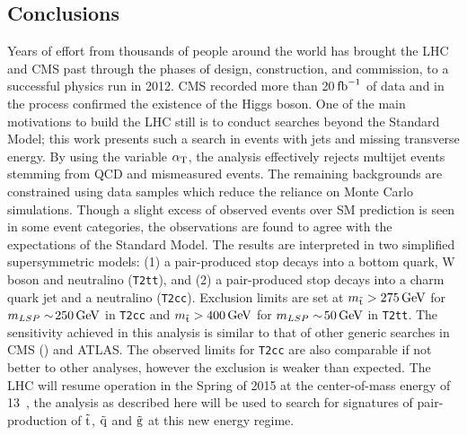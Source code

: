 \FloatBarrier
\subsection{Conclusions}


Years of effort from thousands of people around the world
has brought the LHC and CMS past through the phases of design, construction,
and commission, to a successful physics run in 2012. CMS recorded more than 
20$\mbox{\ensuremath{\,\text{fb}^\text{$-$1}}}$ of data and in the process confirmed the existence of the Higgs boson. 
One of the main motivations to build the LHC still is to conduct
searches beyond the Standard Model; this work presents such a search
in events with jets and missing transverse energy. By using the variable $\alpha_{\text{T}}$,
the analysis effectively rejects multijet events stemming from QCD and 
mismeasured events. The remaining backgrounds are constrained using
data samples which reduce the reliance on Monte Carlo simulations. Though
a slight excess of observed events over SM prediction is seen in some event categories, 
the observations are found to agree with the expectations of the Standard Model. 
The results are interpreted in two simplified supersymmetric models: (1) a 
pair-produced stop decays into a bottom quark, W boson and neutralino 
(\texttt{T2tt}), and (2) a pair-produced stop decays into a charm quark 
jet and a neutralino (\texttt{T2cc}). 
Exclusion limits are set at $m_{\tilde{\rm t}}>275\,\text{Ge\hspace{-.08em}V}$ for $m_{LSP}\sim\!250\,\text{Ge\hspace{-.08em}V}$ 
in \texttt{T2cc} and $m_{\tilde{\rm t}}>400\,\text{Ge\hspace{-.08em}V}$ for $m_{LSP}\sim\!50\,\text{Ge\hspace{-.08em}V}$ in \texttt{T2tt}. 
The sensitivity achieved in this analysis is similar to that of other 
generic searches in CMS (\cite{CMS-PAS-SUS-14-008,cms-pas-sus-09001})
and ATLAS. The observed limits for \texttt{T2cc} are also comparable 
if not better to other analyses, however the  exclusion is 
weaker than expected. The LHC will resume operation in the Spring of 
2015 at the center-of-mass energy of 13~\TeV, the \alphat 
analysis as described here will be used to search for signatures of 
pair-production of $\tilde{\rm t}$, $\tilde{\rm q}$ and $\tilde{\rm g}$ at this new energy regime.
